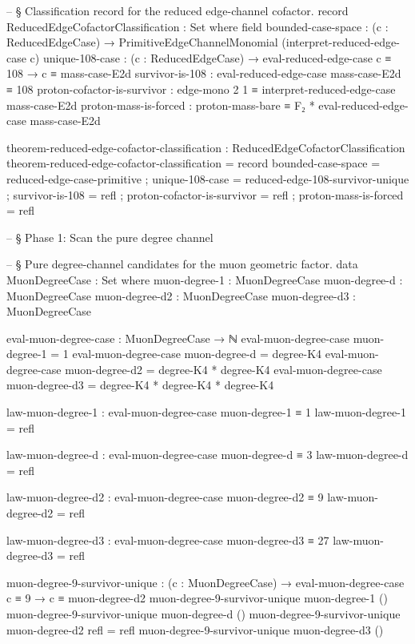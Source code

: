 \documentclass[11pt,a4paper]{book}
\begin{document}
\begin{code}
-- § Classification record for the reduced edge-channel cofactor.
record ReducedEdgeCofactorClassification : Set where
  field
    bounded-case-space :
      (c : ReducedEdgeCase) →
      PrimitiveEdgeChannelMonomial (interpret-reduced-edge-case c)
    unique-108-case :
      (c : ReducedEdgeCase) →
      eval-reduced-edge-case c ≡ 108 →
      c ≡ mass-case-E2d
    survivor-is-108 : eval-reduced-edge-case mass-case-E2d ≡ 108
    proton-cofactor-is-survivor :
      edge-mono 2 1 ≡ interpret-reduced-edge-case mass-case-E2d
    proton-mass-is-forced : proton-mass-bare ≡ F₂ * eval-reduced-edge-case mass-case-E2d

theorem-reduced-edge-cofactor-classification : ReducedEdgeCofactorClassification
theorem-reduced-edge-cofactor-classification = record
  { bounded-case-space = reduced-edge-case-primitive
  ; unique-108-case = reduced-edge-108-survivor-unique
  ; survivor-is-108 = refl
  ; proton-cofactor-is-survivor = refl
  ; proton-mass-is-forced = refl
  }



-- § Phase 1: Scan the pure degree channel

-- § Pure degree-channel candidates for the muon geometric factor.
data MuonDegreeCase : Set where
  muon-degree-1  : MuonDegreeCase
  muon-degree-d  : MuonDegreeCase
  muon-degree-d2 : MuonDegreeCase
  muon-degree-d3 : MuonDegreeCase

eval-muon-degree-case : MuonDegreeCase → ℕ
eval-muon-degree-case muon-degree-1  = 1
eval-muon-degree-case muon-degree-d  = degree-K4
eval-muon-degree-case muon-degree-d2 = degree-K4 * degree-K4
eval-muon-degree-case muon-degree-d3 = degree-K4 * degree-K4 * degree-K4

law-muon-degree-1 : eval-muon-degree-case muon-degree-1 ≡ 1
law-muon-degree-1 = refl

law-muon-degree-d : eval-muon-degree-case muon-degree-d ≡ 3
law-muon-degree-d = refl

law-muon-degree-d2 : eval-muon-degree-case muon-degree-d2 ≡ 9
law-muon-degree-d2 = refl

law-muon-degree-d3 : eval-muon-degree-case muon-degree-d3 ≡ 27
law-muon-degree-d3 = refl

muon-degree-9-survivor-unique :
  (c : MuonDegreeCase) →
  eval-muon-degree-case c ≡ 9 →
  c ≡ muon-degree-d2
muon-degree-9-survivor-unique muon-degree-1 ()
muon-degree-9-survivor-unique muon-degree-d ()
muon-degree-9-survivor-unique muon-degree-d2 refl = refl
muon-degree-9-survivor-unique muon-degree-d3 ()


\end{code}
\end{document}
